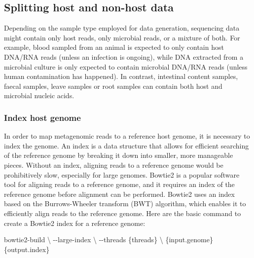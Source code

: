 \documentclass[
]{book}
\newenvironment{Shaded}{\begin{snugshade}}{\end{snugshade}}
\newcommand{\AttributeTok}[1]{\textcolor[rgb]{0.13,0.29,0.53}{#1}}
\newcommand{\DataTypeTok}[1]{\textcolor[rgb]{0.13,0.29,0.53}{#1}}
\newcommand{\ExtensionTok}[1]{#1}
\newcommand{\NormalTok}[1]{#1}
\begin{document}
\normalsize

\hypertarget{splitting-host-and-non-host-data}{%
\subsection*{Splitting host and non-host data}\label{splitting-host-and-non-host-data}}

Depending on the sample type employed for data generation, sequencing data might contain only host reads, only microbial reads, or a mixture of both. For example, blood sampled from an animal is expected to only contain host DNA/RNA reads (unless an infection is ongoing), while DNA extracted from a microbial culture is only expected to contain microbial DNA/RNA reads (unless human contamination has happened). In contrast, intestinal content samples, faecal samples, leave samples or root samples can contain both host and microbial nucleic acids.

\hypertarget{index-host-genome}{%
\subsubsection*{Index host genome}\label{index-host-genome}}

In order to map metagenomic reads to a reference host genome, it is necessary to index the genome. An index is a data structure that allows for efficient searching of the reference genome by breaking it down into smaller, more manageable pieces. Without an index, aligning reads to a reference genome would be prohibitively slow, especially for large genomes. Bowtie2 is a popular software tool for aligning reads to a reference genome, and it requires an index of the reference genome before alignment can be performed. Bowtie2 uses an index based on the Burrows-Wheeler transform (BWT) algorithm, which enables it to efficiently align reads to the reference genome. Here are the basic command to create a Bowtie2 index for a reference genome:

\small

\begin{Shaded}
\begin{Highlighting}[]
\ExtensionTok{bowtie2{-}build} \DataTypeTok{\textbackslash{}}
    \AttributeTok{{-}{-}large{-}index} \DataTypeTok{\textbackslash{}}
    \AttributeTok{{-}{-}threads}\NormalTok{ \{threads\} }\DataTypeTok{\textbackslash{}}
\NormalTok{        \{input.genome\} \{output.index\}}
\end{Highlighting}
\end{Shaded}
\end{document}
